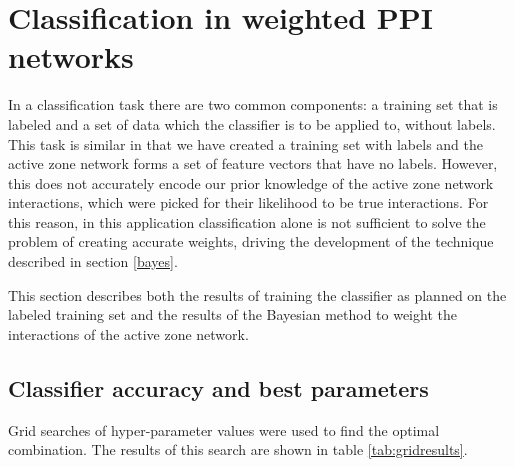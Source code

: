 \section{Classification in weighted \ac{PPI} networks}

In a classification task there are two common components: a training set that is labeled and a set of data which the classifier is to be applied to, without labels.
This task is similar in that we have created a training set with labels and the active zone network forms a set of feature vectors that have no labels.
However, this does not accurately encode our prior knowledge of the active zone network interactions, which were picked for their likelihood to be true interactions.
For this reason, in this application classification alone is not sufficient to solve the problem of creating accurate weights, driving the development of the technique described in section \ref{bayes}.

This section describes both the results of training the classifier as planned on the labeled training set and the results of the Bayesian method to weight the interactions of the active zone network.

\subsection{Classifier accuracy and best parameters}
\label{gridresults}

Grid searches of hyper-parameter values were used to find the optimal combination.
The results of this search are shown in table \ref{tab:gridresults}.

